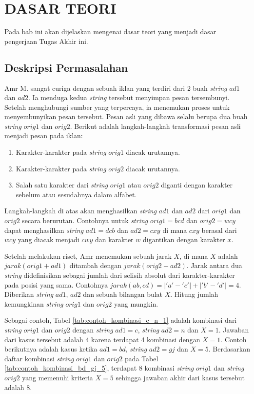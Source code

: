 \chapter{DASAR TEORI}
Pada bab ini akan dijelaskan mengenai dasar teori yang menjadi dasar pengerjaan Tugas Akhir ini.

\section{Deskripsi Permasalahan} \label{section:deskripsi_permasalahan}
Amr M. sangat curiga dengan sebuah iklan yang terdiri dari 2 buah \textit{string} $ad1$ dan $ad2$. Ia menduga kedua \textit{string} tersebut menyimpan pesan tersembunyi. Setelah menghubungi sumber yang terpercaya, ia menemukan proses untuk menyembunyikan pesan tersebut. Pesan asli yang dibawa selalu berupa dua buah \textit{string} $orig1$ dan $orig2$. Berikut adalah langkah-langkah transformasi pesan asli menjadi pesan pada iklan:

\begin{enumerate}
	\item Karakter-karakter pada \textit{string} $orig1$ diacak urutannya.
	\item Karakter-karakter pada \textit{string} $orig2$ diacak urutannya.
	\item Salah satu karakter dari \textit{string} $orig1$ atau $orig2$ diganti dengan karakter sebelum atau sesudahnya dalam alfabet.
\end{enumerate}

Langkah-langkah di atas akan menghasilkan \textit{string} $ad1$ dan $ad2$ dari $orig1$ dan $orig2$ secara berurutan. Contohnya untuk \textit{string} $orig1 = bcd $ dan $orig2 = wcy$ dapat menghasilkan \textit{string} $ad1 = dcb$ dan $ad2 = cxy$ di mana $cxy$ berasal dari $wcy$ yang diacak menjadi $cwy$ dan karakter $w$ digantikan dengan karakter $x$.

Setelah melakukan riset, Amr menemukan sebuah jarak $X$, di mana $X$ adalah $jarak(orig1 + ad1)$ ditambah dengan $jarak(orig2 + ad2)$. Jarak antara dua \textit{string} didefinisikan sebagai jumlah dari selisih absolut dari karakter-karakter pada posisi yang sama. Contohnya $jarak(ab, cd) = |'a' - 'c'| + |'b' - 'd'| = 4$. Diberikan \textit{string} $ad1$, $ad2$ dan sebuah bilangan bulat $X$. Hitung jumlah kemungkinan \textit{string} $orig1$ dan $orig2$ yang mungkin.

Sebagai contoh, Tabel \ref{tab:contoh_kombinasi_c_n_1} adalah kombinasi dari \textit{string} $ orig1 $ dan $ orig2 $ dengan \textit{string} $ ad1=c $, \textit{string} $ ad2=n $ dan $ X=1 $. Jawaban dari kasus tersebut adalah 4 karena terdapat 4 kombinasi dengan $ X=1 $. Contoh berikutnya adalah kasus ketika $ ad1=bd $, \textit{string} $ ad2=gj $ dan $ X=5 $. Berdasarkan daftar kombinasi \textit{string} $ orig1 $ dan $ orig2 $ pada Tabel \ref{tab:contoh_kombinasi_bd_gj_5}, terdapat $ 8 $ kombinasi \textit{string} $ orig1 $ dan \textit{string} $ orig2 $ yang memenuhi kriteria $ X = 5 $ sehingga jawaban akhir dari kasus tersebut adalah $ 8 $. 

